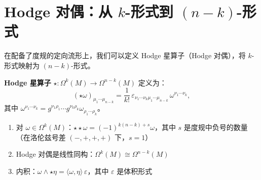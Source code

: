 \section{Hodge 对偶：从 $k$-形式到 $(n-k)$-形式}

在配备了度规的定向流形上，我们可以定义 Hodge 星算子（Hodge 对偶），将 $k$-形式映射为 $(n-k)$-形式。

\begin{definition}
\textbf{Hodge 星算子} $\star: \Omega^k(M) \to \Omega^{n-k}(M)$ 定义为：
\begin{equation}
    (\star \omega)_{\mu_1\cdots\mu_{n-k}} = \frac{1}{k!} \, \varepsilon_{\nu_1\cdots\nu_k\mu_1\cdots\mu_{n-k}} \, \omega^{\nu_1\cdots\nu_k},
\end{equation}
其中 $\omega^{\nu_1\cdots\nu_k} = g^{\nu_1\rho_1} \cdots g^{\nu_k\rho_k} \omega_{\rho_1\cdots\rho_k}$。
\end{definition}

\begin{property}
\begin{enumerate}
    \item 对 $\omega \in \Omega^k(M)$：$\star\!\star\omega = (-1)^{k(n-k) + s} \omega$，其中 $s$ 是度规中负号的数量（在洛伦兹号差 $(-,+,+,+)$ 下，$s=1$）
    \item Hodge 对偶是线性同构：$\Omega^k(M) \cong \Omega^{n-k}(M)$
    \item 内积：$\omega \wedge \star \eta = \langle \omega, \eta \rangle \, \varepsilon$，其中 $\varepsilon$ 是体积形式
\end{enumerate}
\end{property}

